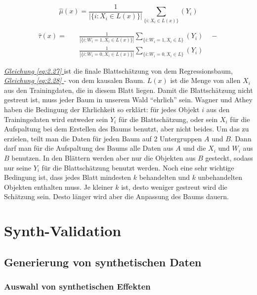 \documentclass[12pt,a4paper,twoside]{scrartcl}
\numberwithin{equation}{section}
\renewcommand*{\refeq}[1]{\emph{\hyperref[#1]{Gleichung \ref*{#1} }}}
\begin{document}
\begin{equation}\label{eq:2.27}
	\hat \mu(x) = \frac{1}{|\{i : X_i \in L(x)\}|}\sum_{\{i : X_i \in L(x)\}}(Y_i)
\end{equation} 

\begin{equation}\label{eq:2.28}
\begin{split}
	\hat \tau(x) = \quad&\frac{1}{|\{i : W_i = 1,X_i \in L(x)\}|}\sum_{\{i : W_i = 1,X_i \in L\}}(Y_i)\quad - \\ 
	&\frac{1}{|\{i : W_i = 0,X_i \in L(x)\}|}\sum_{\{i : W_i = 0,X_i \in L\}}(Y_i)
\end{split}
\end{equation} 

\noindent
\refeq{eq:2.27} ist die finale Blattschätzung von dem Regressionsbaum, \refeq{eq:2.28} - von dem kausalen Baum. $L(x)$ ist die Menge von allen $X_i$ aus den Trainingdaten, die in diesem Blatt liegen. Damit die Blattschätzung nicht gestreut ist, muss jeder Baum in unserem Wald \enquote{ehrlich} sein. Wagner und Athey\cite{wager2018estimation} haben die Bedingung der Ehrlichkeit so erklärt: für jedes Objekt $i$ aus den Trainingsdaten wird entweder sein $Y_i$ für die Blattschätzung, oder sein $X_i$ für die Aufspaltung bei dem Erstellen des Baums benutzt, aber nicht beides. Um das zu erzielen, teilt man die Daten für jeden Baum auf 2 Untergruppen $A$ und $B$. Dann darf man für die Aufspaltung des Baums alle Daten aus $A$ und die $X_i$ und $W_i$ aus $B$ benutzen. In den Blättern werden aber nur die Objekten aus $B$ gesteckt, sodass nur seine $Y_i$ für die Blattschätzung benutzt werden. Noch eine sehr wichtige Bedingung ist, dass jedes Blatt mindesten $k$ behandelten und $k$ unbehandelten Objekten enthalten muss. Je kleiner $k$ ist, desto weniger gestreut wird die Schätzung sein. Desto länger wird aber die Anpassung des Baums dauern\cite{wager2018estimation}.   

\clearpage

\section{Synth-Validation}\label{sec:synthValidation}
  	\subsection{Generierung von synthetischen Daten}\label{subsec:generierungSynthDaten}
  		\subsubsection{Auswahl von synthetischen Effekten}\label{subsubsec:auswahlSynthEffekten}
\end{document}
